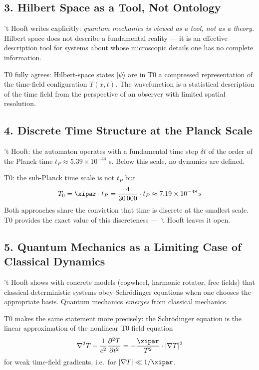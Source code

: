 \subsection{3. Hilbert Space as a Tool, Not Ontology}

't Hooft writes explicitly: \emph{quantum mechanics is viewed as a tool, not as
a theory.} Hilbert space does not describe a fundamental reality — it is an
effective description tool for systems about whose microscopic details one has
no complete information.

T0 fully agrees: Hilbert-space states $|\psi\rangle$ are in T0 a compressed
representation of the time-field configuration $T(x,t)$. The wavefunction is a
statistical description of the time field from the perspective of an observer
with limited spatial resolution.

\subsection{4. Discrete Time Structure at the Planck Scale}

't Hooft: the automaton operates with a fundamental time step $\delta t$ of the
order of the Planck time $t_P \approx 5.39 \times 10^{-44}$ s. Below this scale,
no dynamics are defined.

T0: the sub-Planck time scale is not $t_P$ but
\begin{equation}
    T_0 = \xipar \cdot t_P = \frac{4}{30\,000} \cdot t_P
    \approx 7.19 \times 10^{-48} \, \text{s}
    \label{eq:t0_time}
\end{equation}
Both approaches share the conviction that time is discrete at the smallest
scale. T0 provides the exact value of this discreteness — 't Hooft leaves it open.

\subsection{5. Quantum Mechanics as a Limiting Case of Classical Dynamics}

't Hooft shows with concrete models (cogwheel, harmonic rotator, free fields)
that classical-deterministic systems obey Schrödinger equations when one chooses
the appropriate basis. Quantum mechanics \emph{emerges} from classical mechanics.

T0 makes the same statement more precisely: the Schrödinger equation is the
linear approximation of the nonlinear T0 field equation
\begin{equation}
    \nabla^2 T - \frac{1}{c^2}\frac{\partial^2 T}{\partial t^2}
    = -\frac{\xipar}{T^2} \cdot |\nabla T|^2
    \label{eq:t0_field_equation}
\end{equation}
for weak time-field gradients, i.e.\ for $|\nabla T| \ll 1/\xipar$.

